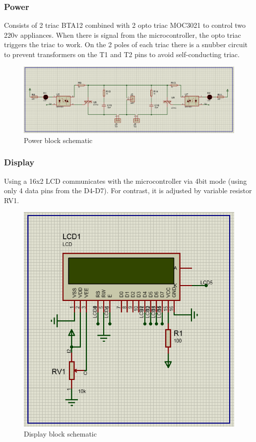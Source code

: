 \documentclass[a4paper]{article}
\begin{document}
\subsubsection{Power}
Consists of 2 triac BTA12 combined with 2 opto triac MOC3021 to control two 220v appliances. When there is signal from the microcontroller, the opto triac triggers the triac to work. On the 2 poles of each triac there is a snubber circuit to prevent transformers on the T1 and T2 pins to avoid self-conducting triac.
\begin{figure}[h!]
\centering
\includegraphics[width=17cm]{images/power.png}
\caption*{Power block schematic}
\end{figure}
\subsubsection{Display}
Using a 16x2 LCD communicates with the microcontroller via 4bit mode (using only 4 data pins from the D4-D7). For contrast, it is adjusted by variable resistor RV1.
\begin{figure}[h!]
\centering
\includegraphics[width=12.5cm]{images/display.PNG}
\caption*{Display block schematic}
\end{figure}
\end{document}
